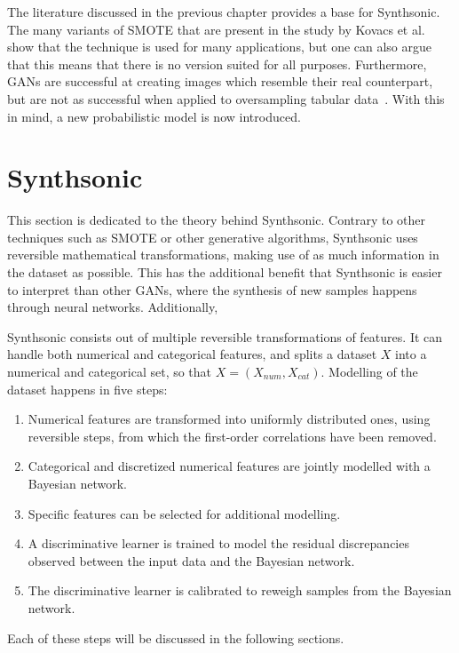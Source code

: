 The literature discussed in the previous chapter provides a base for Synthsonic. The many variants of SMOTE that are present in the study by Kovacs et al.~\cite{Kovacs2019AnDatasets} show that the technique is used for many applications, but one can also argue that this means that there is no version suited for all purposes. Furthermore, GANs are successful at creating images which resemble their real counterpart, but are not as successful when applied to oversampling tabular data~\cite{Camino2020OversamplingEffort}. With this in mind, a new probabilistic model is now introduced.

\section{Synthsonic}
This section is dedicated to the theory behind Synthsonic. Contrary to other techniques such as SMOTE or other generative algorithms, Synthsonic uses reversible mathematical transformations, making use of as much information in the dataset as possible. This has the additional benefit that Synthsonic is easier to interpret than other GANs, where the synthesis of new samples happens through neural networks. Additionally, 

Synthsonic consists out of multiple reversible transformations of features. It can handle both numerical and categorical features, and splits a dataset $X$ into a numerical and categorical set, so that $X = (X_{num}, X_{cat})$. Modelling of the dataset happens in five steps:

\begin{enumerate}
    \item Numerical features are transformed into uniformly distributed ones, using reversible steps, from which the first-order correlations have been removed.
    \item Categorical and discretized numerical features are jointly modelled with a Bayesian network.
    \item Specific features can be selected for additional modelling.
    \item A discriminative learner is trained to model the residual discrepancies observed between the input data and the Bayesian network.
    \item The discriminative learner is calibrated to reweigh samples from the Bayesian network.
\end{enumerate}

Each of these steps will be discussed in the following sections.

